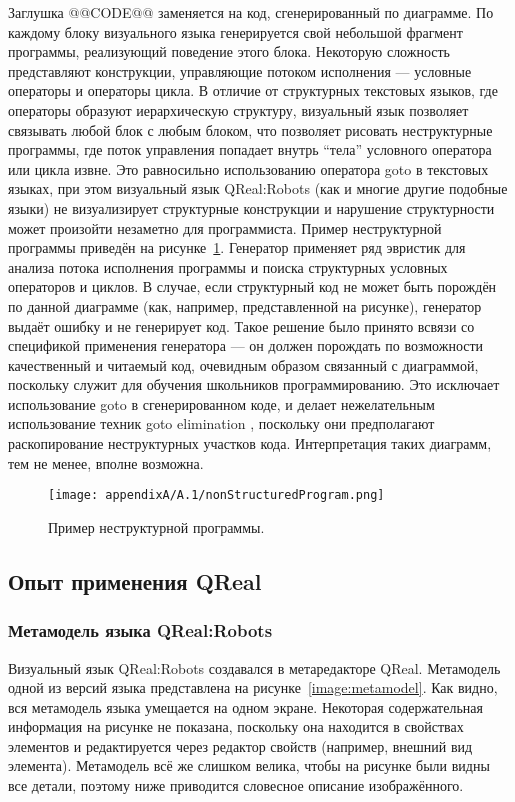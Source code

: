 Заглушка @@CODE@@ заменяется на код, сгенерированный по диаграмме. По каждому блоку 
визуального языка генерируется свой небольшой фрагмент программы, реализующий поведение 
этого блока. Некоторую сложность представляют конструкции, управляющие потоком исполнения 
--- условные операторы и операторы цикла. В отличие от структурных текстовых языков, 
где операторы образуют иерархическую структуру, визуальный язык позволяет связывать 
любой блок с любым блоком, что позволяет рисовать неструктурные программы, где поток 
управления попадает внутрь "`тела"' условного оператора или цикла извне. Это равносильно 
использованию оператора goto в текстовых языках, при этом визуальный язык QReal:Robots 
(как и многие другие подобные языки) не визуализирует структурные конструкции и нарушение 
структурности может произойти незаметно для программиста. Пример неструктурной программы 
приведён на рисунке~\ref{image:nonStructuredProgram}. Генератор применяет ряд эвристик 
для анализа потока исполнения программы и поиска структурных условных операторов и 
циклов. В случае, если структурный код не может быть порождён по данной диаграмме 
(как, например, представленной на рисунке), генератор выдаёт ошибку и не генерирует 
код. Такое решение было принято всвязи со спецификой применения генератора --- он 
должен порождать по возможности качественный и читаемый код, очевидным образом связанный 
с диаграммой, поскольку служит для обучения школьников программированию. Это исключает
использование goto в сгенерированном коде, и делает нежелательным использование техник goto elimination%
, поскольку они предполагают раскопирование неструктурных участков кода. Интерпретация 
таких диаграмм, тем не менее, вполне возможна.

\begin{figure} [ht]
	\begin{center}
		\texttt{[image: appendixA/A.1/nonStructuredProgram.png]}
		\caption{Пример неструктурной программы.}
		\label{image:nonStructuredProgram}
	\end{center}
\end{figure}

\subsection{Опыт применения QReal}
\subsubsection{Метамодель языка QReal:Robots}
Визуальный язык QReal:Robots создавался в метаредакторе QReal. Метамодель одной из 
версий языка представлена на рисунке~\ref{image:metamodel}. Как видно, вся метамодель 
языка умещается на одном экране. Некоторая содержательная информация на рисунке не 
показана, поскольку она находится в свойствах элементов и редактируется через редактор 
свойств (например, внешний вид элемента). Метамодель всё же слишком велика, чтобы на 
рисунке были видны все детали, поэтому ниже приводится словесное описание изображённого.

